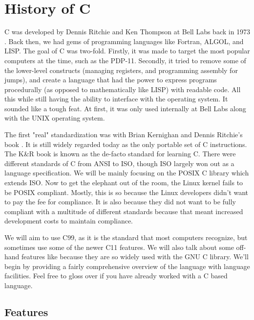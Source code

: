 \section{History of C}

C was developed by Dennis Ritchie and Ken Thompson at Bell Labs back in 1973 \cite{Ritchie:1993:DCL:155360.155580}.
Back then, we had gems of programming languages like Fortran, ALGOL, and LISP.
The goal of C was two-fold.
Firstly, it was made to target the most popular computers at the time, such as the PDP-11.
Secondly, it tried to remove some of the lower-level constructs (managing registers, and programming assembly for jumps), and create a language that had the power to express programs procedurally (as opposed to mathematically like LISP) with readable code.
All this while still having the ability to interface with the operating system.
It sounded like a tough feat.
At first, it was only used internally at Bell Labs along with the UNIX operating system.

The first "real" standardization was with Brian Kernighan and Dennis Ritchie's book \cite{kernighan1988c}.
It is still widely regarded today as the only portable set of C instructions.
The K\&R book is known as the de-facto standard for learning C.
There were different standards of C from ANSI to ISO, though ISO largely won out as a language specification.
We will be mainly focusing on the POSIX C library which extends ISO.
Now to get the elephant out of the room, the Linux kernel fails to be POSIX compliant.
Mostly, this is so because the Linux developers didn't want to pay the fee for compliance.
It is also because they did not want to be fully compliant with a multitude of different standards because that meant increased development costs to maintain compliance.

We will aim to use C99, as it is the standard that most computers recognize, but sometimes use some of the newer C11 features.
We will also talk about some off-hand features like  because they are so widely used with the GNU C library.
We'll begin by providing a fairly comprehensive overview of the language with language facilities.
Feel free to gloss over if you have already worked with a C based language.

\subsection{Features}

